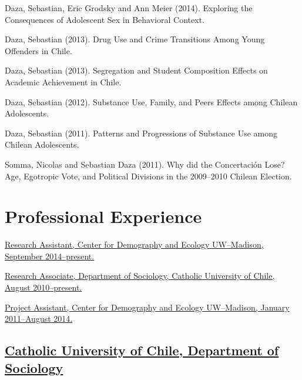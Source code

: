\documentclass[10pt,letterpaper]{article}
\renewenvironment{itemize}{
  \begin{list}{}{
    \setlength{\leftmargin}{1.5em}
    \setlength{\itemsep}{0.25em}
    \setlength{\parskip}{0pt}
    \setlength{\parsep}{0.25em}
  }
}{
  \end{list}
}
\begin{document}
\begin{itemize}

\item Daza, Sebastian, Eric Grodsky and Ann Meier (2014). {Exploring the Consequences of Adolescent Sex in Behavioral Context.}

\item Daza, Sebastian (2013).
  {Drug Use and Crime Transitions Among Young Offenders in Chile}.
  \item Daza, Sebastian (2013).
  {Segregation and Student Composition Effects on Academic Achievement in Chile}.
\item Daza, Sebastian (2012).
  {Substance Use, Family, and Peers Effects among Chilean Adolescents}.
\item Daza, Sebastian (2011).
  {Patterns and Progressions of Substance Use among Chilean Adolescents}.
\item Somma, Nicolas and Sebastian Daza (2011).
  {Why did the Concertación Lose? Age, Egotropic Vote, and Political Divisions in the 2009--2010 Chilean Election}.

\end{itemize}

\section*{Professional Experience}

\begin{itemize}
\item \href{http://www.ssc.wisc.edu/cde/people/grads.php}{Research Assistant, Center for Demography and Ecology UW--Madison, September 2014--present.}
\item \href{http://sociologia.uc.cl/catdesuc/desucquien.html}{Research Associate, Department of Sociology, Catholic University of Chile, August 2010--present.}
\item \href{http://www.ssc.wisc.edu/cde/people/grads.php}{Project Assistant, Center for Demography and Ecology UW--Madison, January 2011--August 2014.}
\end{itemize}

\subsection*{\href{http://sociologia.uc.cl/}{Catholic University of Chile, Department of Sociology}}
\end{document}

